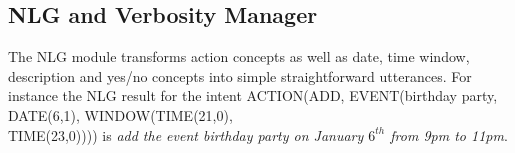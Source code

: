     
    \subsection{NLG and Verbosity Manager}
		
			The NLG module transforms action concepts as well as date, time window, description and yes/no concepts into simple straightforward utterances. For instance the NLG result for the intent ACTION(ADD, EVENT(birthday party, DATE(6,1), WINDOW(TIME(21,0), \\ TIME(23,0)))) is \textit{add the event birthday party on January $6^{th}$ from 9pm to 11pm}.
			
